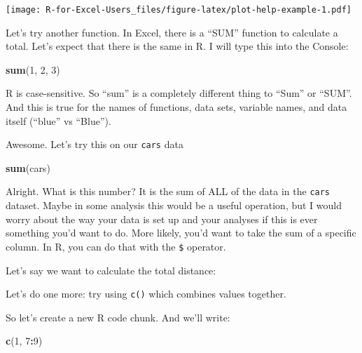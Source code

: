 \documentclass[]{book}
\newenvironment{Shaded}{\begin{snugshade}}{\end{snugshade}}
\newcommand{\DecValTok}[1]{\textcolor[rgb]{0.00,0.00,0.81}{#1}}
\newcommand{\KeywordTok}[1]{\textcolor[rgb]{0.13,0.29,0.53}{\textbf{#1}}}
\newcommand{\NormalTok}[1]{#1}
\newcommand{\OperatorTok}[1]{\textcolor[rgb]{0.81,0.36,0.00}{\textbf{#1}}}
\begin{document}
\texttt{[image: R-for-Excel-Users\_files/figure-latex/plot-help-example-1.pdf]}

Let's try another function. In Excel, there is a ``SUM'' function to calculate a total. Let's expect that there is the same in R. I will type this into the Console:

\begin{Shaded}
\begin{Highlighting}[]
\KeywordTok{sum}\NormalTok{(}\DecValTok{1}\NormalTok{, }\DecValTok{2}\NormalTok{, }\DecValTok{3}\NormalTok{)}
\end{Highlighting}
\end{Shaded}

R is case-sensitive. So ``sum'' is a completely different thing to ``Sum'' or ``SUM''. And this is true for the names of functions, data sets, variable names, and data itself (``blue'' vs ``Blue'').

Awesome. Let's try this on our \texttt{cars} data

\begin{Shaded}
\begin{Highlighting}[]
\KeywordTok{sum}\NormalTok{(cars)}
\end{Highlighting}
\end{Shaded}

Alright. What is this number? It is the sum of ALL of the data in the \texttt{cars} dataset. Maybe in some analysis this would be a useful operation, but I would worry about the way your data is set up and your analyses if this is ever something you'd want to do. More likely, you'd want to take the sum of a specific column. In R, you can do that with the \texttt{\$} operator.

Let's say we want to calculate the total distance:

\begin{Shaded}
\end{Shaded}

Let's do one more: try using \texttt{c()} which combines values together.

So let's create a new R code chunk. And we'll write:

\begin{Shaded}
\begin{Highlighting}[]
\KeywordTok{c}\NormalTok{(}\DecValTok{1}\NormalTok{, }\DecValTok{7}\OperatorTok{:}\DecValTok{9}\NormalTok{)}
\end{Highlighting}
\end{Shaded}
\end{document}
